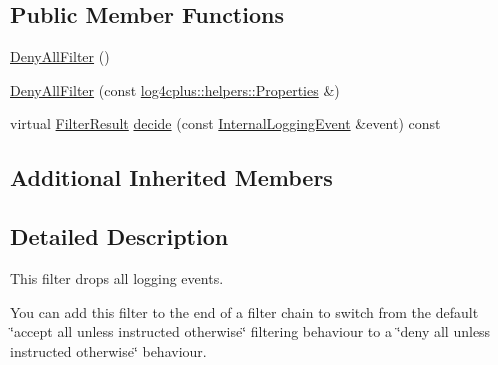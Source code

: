 \subsection*{Public Member Functions}
\begin{DoxyCompactItemize}
\item 
\hyperlink{classlog4cplus_1_1spi_1_1DenyAllFilter_a4ea927c87ca116bf2448a84dcaf0c035}{Deny\-All\-Filter} ()
\item 
\hyperlink{classlog4cplus_1_1spi_1_1DenyAllFilter_a1023635307d8d743a9830904f591c7cf}{Deny\-All\-Filter} (const \hyperlink{classlog4cplus_1_1helpers_1_1Properties}{log4cplus\-::helpers\-::\-Properties} \&)
\item 
virtual \hyperlink{namespacelog4cplus_1_1spi_aa910f475d36c00f943ef78e37d11e3f6}{Filter\-Result} \hyperlink{classlog4cplus_1_1spi_1_1DenyAllFilter_ac6952edfd99def7e84b9e90315782f64}{decide} (const \hyperlink{classlog4cplus_1_1spi_1_1InternalLoggingEvent}{Internal\-Logging\-Event} \&event) const 
\end{DoxyCompactItemize}
\subsection*{Additional Inherited Members}


\subsection{Detailed Description}
This filter drops all logging events.

You can add this filter to the end of a filter chain to switch from the default \char`\"{}accept all unless instructed otherwise\char`\"{} filtering behaviour to a \char`\"{}deny all unless instructed otherwise\char`\"{} behaviour. 

